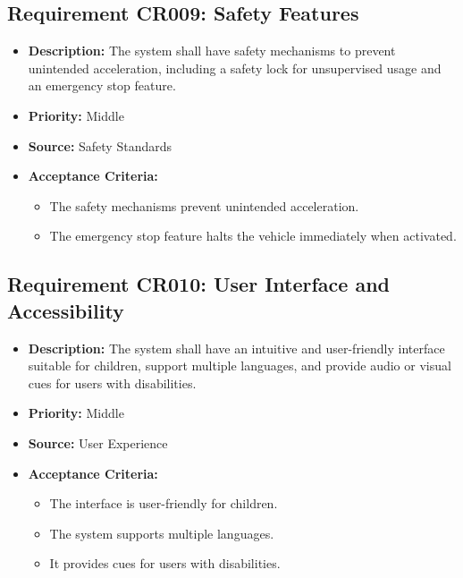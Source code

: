 \documentclass{article}
\begin{document}
	\subsection{Requirement CR009: Safety Features}
	\begin{itemize}
		\item \textbf{Description:} The system shall have safety mechanisms to prevent unintended acceleration, including a safety lock for unsupervised usage and an emergency stop feature.
		\item \textbf{Priority:} Middle
		\item \textbf{Source:} Safety Standards
		\item \textbf{Acceptance Criteria:}
		\begin{itemize}
			\item The safety mechanisms prevent unintended acceleration.
			\item The emergency stop feature halts the vehicle immediately when activated.
		\end{itemize}
	\end{itemize}
	
	\subsection{Requirement CR010: User Interface and Accessibility}
	\begin{itemize}
		\item \textbf{Description:} The system shall have an intuitive and user-friendly interface suitable for children, support multiple languages, and provide audio or visual cues for users with disabilities.
		\item \textbf{Priority:} Middle
		\item \textbf{Source:} User Experience
		\item \textbf{Acceptance Criteria:}
		\begin{itemize}
			\item The interface is user-friendly for children.
			\item The system supports multiple languages.
			\item It provides cues for users with disabilities.
		\end{itemize}
	\end{itemize}
	
\end{document}
